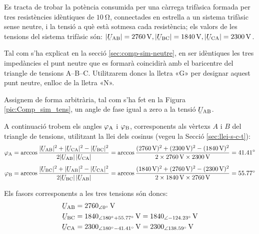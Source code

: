 \begin{exemple}\label{ex:comp-sim}
    Es tracta de trobar la potència consumida per una càrrega trifàsica
    formada per tres resistències idèntiques de $\SI{10}{\ohm}$,
    connectades en estrella a un sistema trifàsic sense neutre, i la
    tensió a què està sotmesa cada resistència; els valors de les
    tensions del sistema trifàsic són: $|\cmplx{U}\ped{AB}| =
    \SI{2760}{V}, |\cmplx{U}\ped{BC}| = \SI{1840}{V},
    |\cmplx{U}\ped{CA}| = \SI{2300}{V}$.

    Tal com s'ha explicat en la secció \vref{sec:comp-sim-neutre}, en ser idèntiques les tres impedàncies el punt neutre que es formarà coincidirà amb el baricentre del triangle de tensions A--B--C. Utilitzarem doncs la lletra «G» per designar aquest punt neutre, enlloc de la lletra «N».

    Assignem de forma arbitrària, tal com s'ha fet en la Figura
    \vref{pic:Comp_sim_tens}, un angle de fase igual a zero a la tensió
    $\cmplx{U}\ped{AB}$.

    \begin{center}
        
    \end{center}

    A continuació trobem els angles $\varphi_\mathrm{A}$ i $\varphi_\mathrm{B}$,
    corresponents als vèrtexs  $A$ i $B$ del triangle de
    tensions, utilitzant la llei dels cosinus (vegeu la Secció
    \vref{sec:llei-s-c-t}): 
    \begin{align*}
        \varphi\ped{A} &= \arccos \frac{|\cmplx{U}\ped{AB}|^2 + |\cmplx{U}\ped{CA}|^2 -
        |\cmplx{U}\ped{BC}|^2}{2 |\cmplx{U}\ped{AB}| \,|\cmplx{U}\ped{CA}|} =
        \arccos \frac{(\SI{2760}{V})^2 + (\SI{2300}{V})^2 - (\SI{1840}{V})^2}{2 \times \SI{2760}{V}
        \times \SI{2300}{V}} = \ang{41,41} \\[1ex]
        \varphi\ped{B} &= \arccos \frac{|\cmplx{U}\ped{BC}|^2 + |\cmplx{U}\ped{AB}|^2 -
        |\cmplx{U}\ped{CA}|^2}{2 |\cmplx{U}\ped{BC}| \,|\cmplx{U}\ped{AB}|} =
        \arccos \frac{(\SI{1840}{V})^2 + (\SI{2760}{V})^2 - (\SI{2300}{V})^2}{2 \times \SI{1840}{V}
        \times \SI{2760}{V}} = \ang{55,77}
    \end{align*}

    Els fasors corresponents a les tres tensions són doncs:
    \begin{align*}
    \cmplx{U}\ped{AB} &= \SIpd{2760}{0}{V} \\
    \cmplx{U}\ped{BC} &= \num{1840}_{\angle\ang{180} + \ang{55,77}}\unit{V} =
    \SIpd{1840}{-124,23}{V} \\
    \cmplx{U}\ped{CA} &= \num{2300}_{\angle\ang{180} - \ang{41,41}}\unit{V} = \SIpd{2300}{138,59}{V}
    \end{align*}


\end{exemple}
